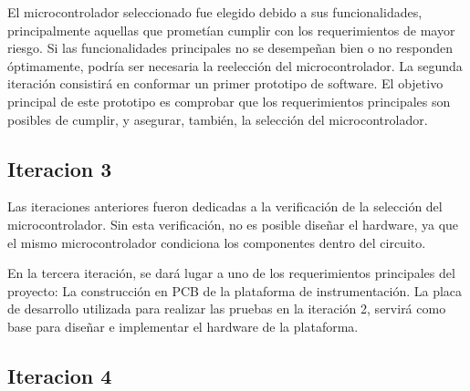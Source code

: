 El microcontrolador seleccionado fue elegido debido a sus funcionalidades, principalmente aquellas que prometían cumplir con los requerimientos de mayor riesgo. Si las funcionalidades principales no se desempeñan bien o no responden óptimamente, podría ser necesaria la reelección del microcontrolador. La segunda iteración consistirá en conformar un primer prototipo de software. El objetivo principal de este prototipo es comprobar que los requerimientos principales son posibles de cumplir, y asegurar, también, la selección del microcontrolador.


\subsection{Iteracion 3} %
\label{sub:iteracion_3}

Las iteraciones anteriores fueron dedicadas a la verificación de la selección del microcontrolador. Sin esta verificación, no es posible diseñar el hardware, ya que el mismo microcontrolador condiciona los componentes dentro del circuito.

En la tercera iteración, se dará lugar a uno de los requerimientos principales del proyecto: La construcción en PCB de la plataforma de instrumentación. La placa de desarrollo utilizada para realizar las pruebas en la iteración 2, servirá como base para diseñar e implementar el hardware de la plataforma.



\subsection{Iteracion 4} %
\label{sub:iteracion_4}

